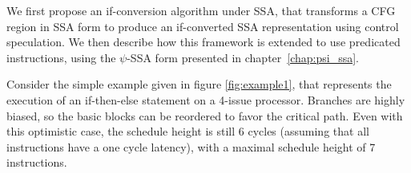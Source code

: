 We first propose an if-conversion algorithm under SSA, that transforms a CFG region in SSA form to produce an if-converted SSA representation using control speculation.
We then describe how this framework is extended to use predicated instructions, using the $\psi$-SSA form presented in chapter~\ref{chap:psi_ssa}.

Consider the simple example given in figure \ref{fig:example1}, that represents the execution of an if-then-else statement on a 4-issue processor. Branches are highly biased, so the basic blocks can be reordered to favor the critical path. Even with this optimistic case, the schedule height is still 6 cycles (assuming that all instructions have a one cycle latency), with a maximal schedule height of 7 instructions. 

\begin{figure}
\footnotesize


\end{figure}
